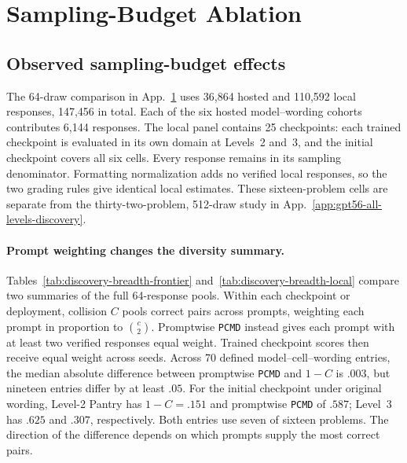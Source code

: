 \documentclass{article}
\newcommand{\1}{\mathbf 1}
\newcommand{\pmd}{\texttt{PCMD}}
\theoremstyle{remark}
\theoremstyle{definition}
\theoremstyle{plain}
\begin{document}
\section{Sampling-Budget Ablation}
\label{app:sampling-budget-ablation}







\subsection{Observed sampling-budget effects}
\label{app:sampling-budget-effects}

The 64-draw comparison in App.~\ref{app:sampling-budget-ablation} uses
36,864 hosted and 110,592 local responses, 147,456 in total. Each of the six
hosted model--wording cohorts contributes 6,144 responses. The local panel
contains 25 checkpoints: each trained checkpoint is evaluated in its own
domain at Levels~2 and~3, and the initial checkpoint covers all six cells.
Every response remains in its sampling denominator. Formatting normalization
adds no verified local responses, so the two grading rules give identical
local estimates. These sixteen-problem cells are separate from the
thirty-two-problem, 512-draw study in
App.~\ref{app:gpt56-all-levels-discovery}.

\paragraph{Prompt weighting changes the diversity summary.}
Tables~\ref{tab:discovery-breadth-frontier} and~\ref{tab:discovery-breadth-local}
compare two summaries of the full 64-response pools. Within each checkpoint
or deployment, collision $C$ pools correct pairs across prompts, weighting
each prompt in proportion to $\binom{c}{2}$. Promptwise \pmd{} instead gives
each prompt with at least two verified responses equal weight. Trained
checkpoint scores then receive equal weight across seeds. Across 70 defined
model--cell--wording entries, the median absolute difference between
promptwise \pmd{} and $1-C$ is $.003$, but nineteen entries differ by at least
$.05$. For the initial checkpoint under original wording, Level-2 Pantry has
$1-C=.151$ and promptwise \pmd{} of $.587$; Level~3 has $.625$ and $.307$,
respectively. Both entries use seven of sixteen problems. The direction of
the difference depends on which prompts supply the most correct pairs.
\end{document}
